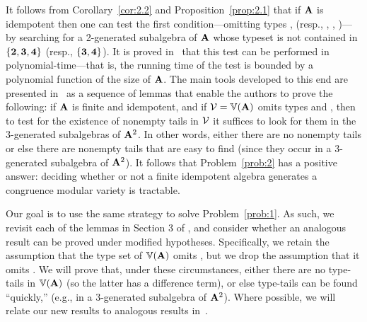 It follows from Corollary~\ref{cor:2.2} and Proposition~\ref{prop:2.1}
that if $\mathbf{A}$ is idempotent then one can
test the first condition---omitting
types \utyp, \styp (resp., \utyp, \atyp, \styp)---by searching
for a 2-generated subalgebra of $\mathbf{A}$ whose typeset is
not contained in
$\{\textbf{2}, \textbf{3}, \textbf{4}\}$ (resp., $\{\textbf{3}, \textbf{4}\}$). It is proved
in~\cite[Section~6]{Freese:2009} that this
test can be performed in polynomial-time---that is, the running
time of the test is bounded by a polynomial function of the size of $\mathbf{A}$.
The main tools developed to this end are presented
in~\cite[Section~3]{Freese:2009} as a sequence of
lemmas that enable the authors to prove the following:
if $\mathbf{A}$ is finite and idempotent, and if
$\mathcal V = \operatorname{\mathbb{V}}(\mathbf{A})$ omits types \utyp and \styp,
then to test for the existence of nonempty tails
in $\mathcal{V}$ it suffices to look for them
in the 3-generated subalgebras of $\mathbf{A}^2$.
In other words, either there are no nonempty tails
or else there are nonempty tails that are easy to find
(since they occur in a 3-generated subalgebra of $\mathbf{A}^2$).
It follows that Problem~\ref{prob:2} has a positive answer:
deciding whether or not a finite idempotent algebra generates a congruence
modular variety is tractable.%

Our goal is to use the same strategy to solve Problem~\ref{prob:1}.
As such, we revisit each of the lemmas in Section 3 of \cite{Freese:2009},
and consider whether an analogous result can be proved under
modified hypotheses.
Specifically, we retain the assumption that the type set of $\operatorname{\mathbb{V}}(\mathbf{A})$
omits \utyp, but we drop the assumption that it omits \styp.
We will  prove that, under these circumstances, %
either there are no type-\atyp tails in $\operatorname{\mathbb{V}}(\mathbf{A})$ (so the latter has a difference term),
or else type-\atyp tails can be found ``quickly,''
(e.g., in a 3-generated subalgebra of $\mathbf{A}^2$).
Where possible, we will relate our new results to
analogous results in~\cite{Freese:2009}.

